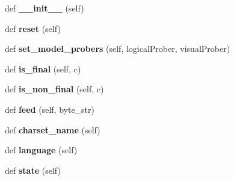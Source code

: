 \begin{DoxyCompactItemize}
\item 
\mbox{\label{classchardet_1_1hebrewprober_1_1_hebrew_prober_a9a1d0d1e8c3614dbf59e8937765e1ce1}} 
def {\bfseries \+\_\+\+\_\+init\+\_\+\+\_\+} (self)
\item 
\mbox{\label{classchardet_1_1hebrewprober_1_1_hebrew_prober_aae637d9f607b2b34dd560f7cef2fd8de}} 
def {\bfseries reset} (self)
\item 
\mbox{\label{classchardet_1_1hebrewprober_1_1_hebrew_prober_a34ce73298b6b31e7d511232d5d93e385}} 
def {\bfseries set\+\_\+model\+\_\+probers} (self, logical\+Prober, visual\+Prober)
\item 
\mbox{\label{classchardet_1_1hebrewprober_1_1_hebrew_prober_a95d72758284a398926f2f1cde882ce73}} 
def {\bfseries is\+\_\+final} (self, c)
\item 
\mbox{\label{classchardet_1_1hebrewprober_1_1_hebrew_prober_ab899e2cd7d9a4971012428ba27a5b754}} 
def {\bfseries is\+\_\+non\+\_\+final} (self, c)
\item 
\mbox{\label{classchardet_1_1hebrewprober_1_1_hebrew_prober_ac2be5cd9248a15261738f3b083204280}} 
def {\bfseries feed} (self, byte\+\_\+str)
\item 
\mbox{\label{classchardet_1_1hebrewprober_1_1_hebrew_prober_a1062b1d6c72359e4d7c9bf95c1e29380}} 
def {\bfseries charset\+\_\+name} (self)
\item 
\mbox{\label{classchardet_1_1hebrewprober_1_1_hebrew_prober_a5afb17b4a41dc2f5b3c109a061df46a0}} 
def {\bfseries language} (self)
\item 
\mbox{\label{classchardet_1_1hebrewprober_1_1_hebrew_prober_a47d974b35e5aeb8cdd8f5731d78ac2ed}} 
def {\bfseries state} (self)
\end{DoxyCompactItemize}
